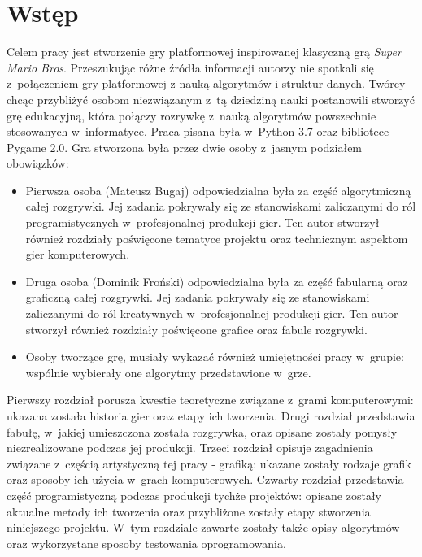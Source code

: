 \documentclass[12pt,a4paper,oneside]{book}
\theoremstyle{definition}
\numberwithin{equation}{chapter}
\begin{document}
\chapter*{ Wstęp} 
\par Celem pracy jest stworzenie gry platformowej inspirowanej klasyczną grą \textit{Super Mario Bros}. Przeszukując różne źródła informacji autorzy nie spotkali się z~połączeniem gry platformowej z nauką algorytmów i struktur danych. Twórcy chcąc przybliżyć osobom niezwiązanym z~tą dziedziną nauki postanowili stworzyć grę edukacyjną, która połączy rozrywkę z~nauką algorytmów powszechnie stosowanych w~informatyce. Praca pisana była w~Python 3.7 oraz bibliotece Pygame 2.0.
Gra stworzona była przez dwie osoby z~jasnym podziałem obowiązków:
\begin{itemize}
    \item Pierwsza osoba (Mateusz Bugaj) odpowiedzialna była za część algorytmiczną całej rozgrywki. Jej zadania pokrywały się ze stanowiskami zaliczanymi do ról programistycznych w~profesjonalnej produkcji gier. Ten autor stworzył również rozdziały poświęcone tematyce projektu oraz technicznym aspektom gier komputerowych.
    \item Druga osoba (Dominik Froński) odpowiedzialna była za część fabularną oraz graficzną całej rozgrywki. Jej zadania pokrywały się ze stanowiskami zaliczanymi do ról kreatywnych w~profesjonalnej produkcji gier. Ten autor stworzył również rozdziały poświęcone grafice oraz fabule rozgrywki.
    \item Osoby tworzące grę, musiały wykazać również umiejętności pracy w~grupie: wspólnie wybierały one algorytmy przedstawione w~grze.
\end{itemize}

\par Pierwszy rozdział porusza kwestie teoretyczne związane z~grami komputerowymi: ukazana została historia gier oraz etapy ich tworzenia. Drugi rozdział przedstawia fabułę, w~jakiej umieszczona została rozgrywka, oraz opisane zostały pomysły niezrealizowane podczas jej produkcji. Trzeci rozdział opisuje zagadnienia związane z~częścią artystyczną tej pracy - grafiką: ukazane zostały rodzaje grafik oraz sposoby ich użycia w~grach komputerowych. Czwarty rozdział przedstawia część programistyczną podczas produkcji tychże projektów: opisane zostały aktualne metody ich tworzenia oraz przybliżone zostały etapy stworzenia niniejszego projektu. W~tym rozdziale zawarte zostały także opisy algorytmów oraz wykorzystane sposoby testowania oprogramowania.
\end{document}
